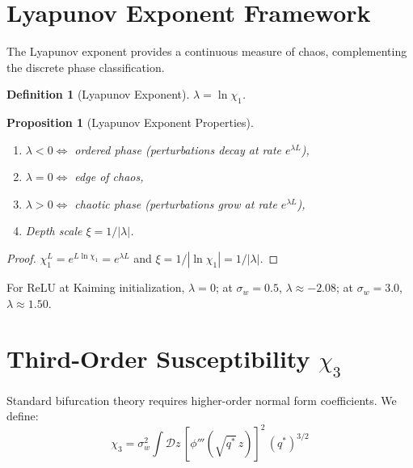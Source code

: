 \documentclass[10pt]{article}
\newtheorem{proposition}[theorem]{Proposition}
\newtheorem{definition}[theorem]{Definition}
\begin{document}
\section{Lyapunov Exponent Framework}
\label{app:lyapunov}

The Lyapunov exponent provides a continuous measure of chaos, complementing the discrete phase classification.

\begin{definition}[Lyapunov Exponent]
\label{def:lyapunov}
$\lambda = \ln \chi_1$.
\end{definition}

\begin{proposition}[Lyapunov Exponent Properties]
\label{prop:lyapunov}
\begin{enumerate}[nosep]
    \item $\lambda < 0 \Leftrightarrow$ ordered phase (perturbations decay at rate $e^{\lambda L}$),
    \item $\lambda = 0 \Leftrightarrow$ edge of chaos,
    \item $\lambda > 0 \Leftrightarrow$ chaotic phase (perturbations grow at rate $e^{\lambda L}$),
    \item Depth scale $\xi = 1/|\lambda|$.
\end{enumerate}
\end{proposition}

\begin{proof}
$\chi_1^L = e^{L \ln \chi_1} = e^{\lambda L}$ and $\xi = 1/|\ln \chi_1| = 1/|\lambda|$.
\end{proof}

For ReLU at Kaiming initialization, $\lambda = 0$; at $\sigma_w = 0.5$, $\lambda \approx -2.08$; at $\sigma_w = 3.0$, $\lambda \approx 1.50$.

\section{Third-Order Susceptibility $\chi_3$}
\label{app:chi3}

Standard bifurcation theory requires higher-order normal form coefficients.
We define:
\begin{equation}
    \chi_3 = \sigma_w^2 \int \mathcal{D}z\, [\phi'''(\sqrt{q^*}\, z)]^2\, (q^*)^{3/2}
\end{equation}
\end{document}
